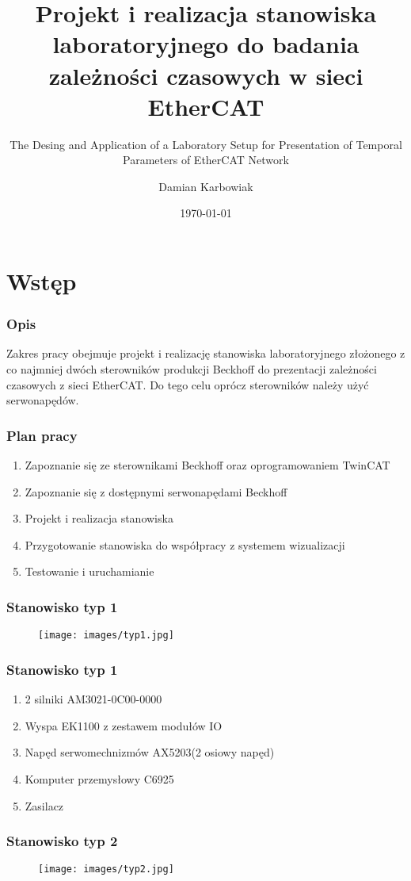 \documentclass[ucs]{beamer}
\title[Zależności czasowe w sieci EtherCAT]{Projekt i realizacja stanowiska laboratoryjnego do badania zależności czasowych w sieci EtherCAT}
\subtitle{The Desing and Application of a Laboratory Setup for Presentation of Temporal Parameters of EtherCAT Network}
\author{Damian Karbowiak}
\institute{Promotor: dr inż. Jacek Stój}
\date{\today}
\begin{document}
\begin{frame}
  \titlepage
\end{frame}

\section{Wstęp}
\begin{frame}
\frametitle{Opis}
Zakres pracy obejmuje projekt i realizację stanowiska laboratoryjnego złożonego z co najmniej dwóch sterowników produkcji Beckhoff do prezentacji zależności czasowych z sieci EtherCAT. Do tego celu oprócz sterowników należy użyć serwonapędów.
\end{frame}

\begin{frame}
\frametitle{Plan pracy}
\begin{enumerate}
    \item Zapoznanie się ze sterownikami Beckhoff oraz oprogramowaniem TwinCAT
    \item Zapoznanie się z dostępnymi serwonapędami Beckhoff
    \item Projekt i realizacja stanowiska
    \item Przygotowanie stanowiska do współpracy z systemem wizualizacji
    \item Testowanie i uruchamianie
\end{enumerate}
\end{frame}

\begin{frame}
\frametitle{Stanowisko typ 1}
\begin{figure}[!htb]	
\centering 	          
\texttt{[image: images/typ1.jpg]}
\end{figure}
\end{frame}

\begin{frame}
\frametitle{Stanowisko typ 1}
\begin{enumerate}
    \item 2 silniki AM3021-0C00-0000
    \item Wyspa EK1100 z zestawem modułów IO
    \item Napęd serwomechnizmów AX5203(2 osiowy napęd)
    \item Komputer przemysłowy C6925
    \item Zasilacz
\end{enumerate}
\end{frame}

\begin{frame}
\frametitle{Stanowisko typ 2}
\begin{figure}[!htb]	
\centering 	          
\texttt{[image: images/typ2.jpg]}
\end{figure}
\end{frame}
\end{document}
